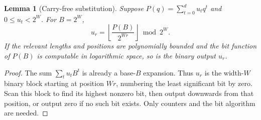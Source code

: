 \documentclass[11pt]{article}
\newtheorem{lemma}[theorem]{Lemma}
\begin{document}
\begin{lemma}[Carry-free substitution]\label{lem:blocks}
Suppose $P(q)=\sum_{t=0}^d u_tq^t$ and $0\leq u_t<2^W$. For $B=2^W$,
\begin{equation}\label{eq:block}
u_r=\left\lfloor\frac{P(B)}{2^{Wr}}\right\rfloor\bmod2^W.
\end{equation}
If the relevant lengths and positions are polynomially bounded and the
bit function of $P(B)$ is computable in logarithmic space, so is the
binary output $u_r$.
\end{lemma}
\begin{proof}
The sum $\sum_tu_tB^t$ is already a base-$B$ expansion. Thus $u_r$ is
the width-$W$ binary block starting at position $Wr$, numbering the
least significant bit by zero. Scan this block to find its highest
nonzero bit, then output downwards from that position, or output zero
if no such bit exists. Only counters and the bit algorithm are needed.
\end{proof}
\end{document}
